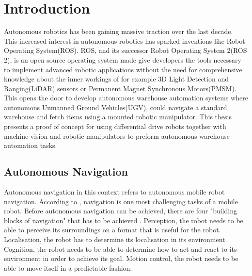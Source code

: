 \chapter{Introduction}

Autonomous robotics has been gaining massive traction over the last decade. This increased interest in autonomous robotics has sparked inventions like Robot Operating System(ROS). ROS, and its successor Robot Operating System 2(ROS 2), is an open source operating system made give developers the tools necessary to implement advanced robotic applications without the need for comprehensive knowledge about the inner workings of for example 3D Light Detection and Ranging(LiDAR) sensors or Permanent Magnet Synchronous Motors(PMSM).  This opens the door to develop autonomous warehouse automation systems where autonomous Unmanned Ground Vehicles(UGV), could navigate a standard warehouse and fetch items using a mounted robotic manipulator. This thesis presents a proof of concept for using differential drive robots together with machine vision and robotic manipulators to preform autonomous warehouse automation tasks.




\section{Autonomous Navigation}\label{sec:I:AutonomousNavigation}
Autonomous navigation in this context refers to autonomous mobile robot navigation. According to \cite{SiegwartRoland2011Itam}, navigation is one most challenging tasks of a mobile robot. Before autonomous navigation can be achieved, there are four "building blocks of navigation" that has to be achieved \cite{SiegwartRoland2011Itam}. Perception, the robot needs to be able to perceive its surroundings on a format that is useful for the robot. Localisation, the robot has to determine its localisation in its environment. Cognition, the robot needs to be able to determine how to act and react to its environment in order to achieve its goal. Motion control, the robot needs to be able to move itself in a predictable fashion.